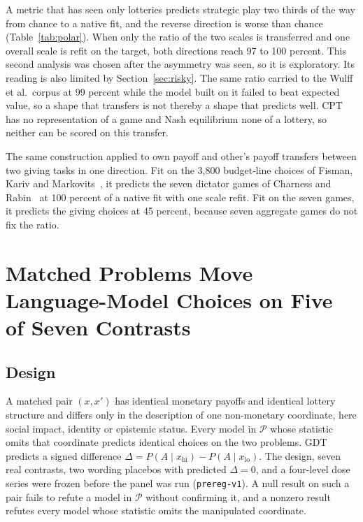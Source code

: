 \documentclass[journal]{IEEEtran}
\newcommand{\Pclass}{\mathcal{P}}
\begin{document}
A metric that has seen only lotteries predicts strategic play two thirds of the way from chance to a native fit, and the reverse direction is worse than chance (Table~\ref{tab:polar}).
When only the ratio of the two scales is transferred and one overall scale is refit on the target, both directions reach 97 to 100 percent.
This second analysis was chosen after the asymmetry was seen, so it is exploratory.
Its reading is also limited by Section~\ref{sec:risky}.
The same ratio carried to the Wulff et al.\ corpus at 99 percent while the model built on it failed to beat expected value, so a shape that transfers is not thereby a shape that predicts well.
CPT has no representation of a game and Nash equilibrium none of a lottery, so neither can be scored on this transfer.

The same construction applied to own payoff and other's payoff transfers between two giving tasks in one direction.
Fit on the 3{,}800 budget-line choices of Fisman, Kariv and Markovits~\cite{fisman2007}, it predicts the seven dictator games of Charness and Rabin~\cite{charness2002} at 100 percent of a native fit with one scale refit.
Fit on the seven games, it predicts the giving choices at 45 percent, because seven aggregate games do not fix the ratio.

\section{Matched Problems Move Language-Model Choices on Five of Seven Contrasts}
\label{sec:projgap}

\subsection{Design}
A matched pair $(x,x')$ has identical monetary payoffs and identical lottery structure and differs only in the description of one non-monetary coordinate, here social impact, identity or epistemic status.
Every model in $\Pclass$ whose statistic omits that coordinate predicts identical choices on the two problems.
GDT predicts a signed difference $\Delta=P(A\mid x_{\text{hi}})-P(A\mid x_{\text{lo}})$.
The design, seven real contrasts, two wording placebos with predicted $\Delta=0$, and a four-level dose series were frozen before the panel was run (\texttt{prereg-v1}).
A null result on such a pair fails to refute a model in $\Pclass$ without confirming it, and a nonzero result refutes every model whose statistic omits the manipulated coordinate.
\end{document}
